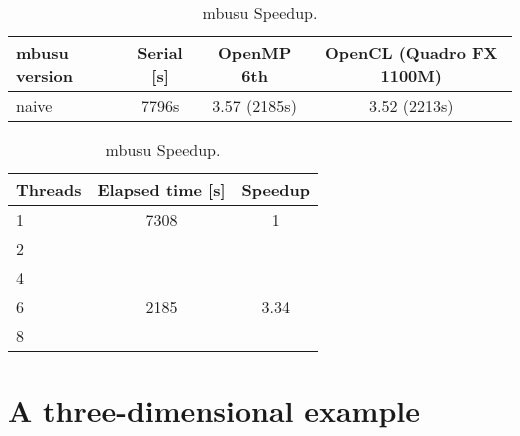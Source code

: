 \begin{table}
  \centering
  \begin{tabular}{l|c|c|c}
    \hline
    mbusu version & Serial [s] & OpenMP 6th & OpenCL (Quadro FX 1100M)\\
    \hline
    \hline
    naive         & 7796s & 3.57 (2185s) & 3.52 (2213s)\\
    \hline
  \end{tabular}
  \caption{mbusu Speedup.}
  \label{tab:speedup}
\end{table} 

\begin{table}
  \centering
  \begin{tabular}{l|c|c}
    \hline
    Threads & Elapsed time [s] & Speedup\\
    \hline
    \hline
    1       & 7308             & 1     \\
    2       &                  &       \\
    4       &                  &       \\
    6       & 2185             & 3.34  \\
    8       &                  &       \\
    \hline
  \end{tabular}
  \caption{mbusu Speedup.}
  \label{tab:speedup}
\end{table} 



\section{A three-dimensional example}

